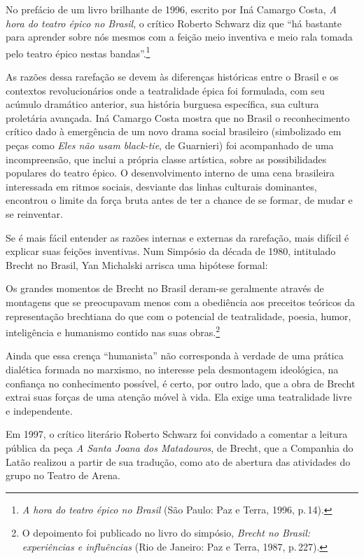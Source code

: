 No prefácio de um livro brilhante de 1996, escrito por Iná Camargo
Costa, {\it A hora do teatro épico no Brasil}, o crítico Roberto Schwarz
diz que “há bastante para aprender sobre nós mesmos com a feição meio
inventiva e meio rala tomada pelo teatro épico nestas
bandas”.\footnote{{\it A hora do teatro épico no Brasil} (São Paulo: Paz
  e Terra, 1996, p.\,14).}

As razões dessa rarefação se devem às diferenças históricas entre o
Brasil e os contextos revolucionários onde a teatralidade épica foi
formulada, com seu acúmulo dramático anterior, sua história burguesa
específica, sua cultura proletária avançada. Iná Camargo Costa mostra
que no Brasil o reconhecimento crítico dado à emergência de um novo
drama social brasileiro (simbolizado em peças como {\it Eles não usam
black-tie}, de Guarnieri) foi acompanhado de uma incompreensão, que
inclui a própria classe artística, sobre as possibilidades populares do
teatro épico. O desenvolvimento interno de uma cena brasileira
interessada em ritmos sociais, desviante das linhas culturais
dominantes, encontrou o limite da força bruta antes de ter a chance de
se formar, de mudar e se reinventar.

Se é mais fácil entender as razões internas e externas da rarefação,
mais difícil é explicar suas feições inventivas. Num Simpósio da década
de 1980, intitulado Brecht no Brasil, Yan Michalski arrisca uma hipótese
formal:

\startblockquote
Os grandes momentos de Brecht no Brasil deram-se geralmente através de
montagens que se preocupavam menos com a obediência aos preceitos
teóricos da representação brechtiana do que com o potencial de
teatralidade, poesia, humor, inteligência e humanismo contido nas suas
obras.\footnote{O depoimento foi publicado no livro do simpósio,
  {\it Brecht no Brasil: experiências e influências} (Rio de Janeiro:
  Paz e Terra, 1987, p.\,227).}
\stopblockquote

Ainda que essa crença “humanista” não corresponda à verdade de uma
prática dialética formada no marxismo, no interesse pela desmontagem
ideológica, na confiança no conhecimento possível, é certo, por outro
lado, que a obra de Brecht extrai suas forças de uma atenção móvel à
vida. Ela exige uma teatralidade livre e independente.

Em 1997, o crítico literário Roberto Schwarz foi convidado a comentar a
leitura pública da peça {\it A Santa Joana dos Matadouros}, de Brecht,
que a Companhia do Latão realizou a partir de sua tradução, como ato de
abertura das atividades do grupo no Teatro de Arena.

